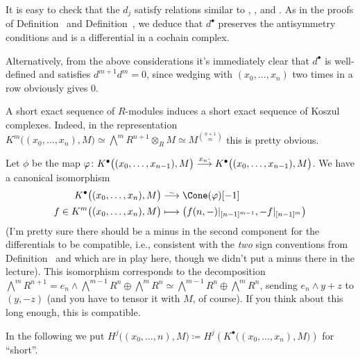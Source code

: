 \documentclass[a4paper,parskip=half,numbers=enddot, DIV=12]{scrreprt}
\begin{document}
\begin{rem}
	\begin{alphanumerate}
		\item {}It is easy to check that the $d_j$ satisfy relations similar to , , and . As in the proofs of Definition~ and Definition~, we deduce that $d^\bullet$ preserves the antisymmetry conditions and is a differential in a cochain complex. 
		
		Alternatively, from the above considerations it's immediately clear that $d^\bullet$ is well-defined and satisfies $d^{m+1}d^m=0$, since wedging with $(x_0,\ldots,x_n)$ two times in a row obviously gives $0$.
		\item A short exact sequence of $R$-modules induces a short exact sequence of Koszul complexes. Indeed, in the representation $K^m\big((x_0,\ldots,x_n),M\big)\simeq \bigwedge^mR^{n+1}\otimes_RM\simeq M^{\binom{n+1}{m}}$ this is pretty obvious.
		\item Let $\phi$ be the map $\phi\colon K^\bullet\big((x_0,\ldots,x_{n-1}),M\big)\morphism[x_n\cdot]K^\bullet\big((x_0,\ldots,x_{n-1}),M\big)$. We have a canonical isomorphism
		\begin{align}\lbl{eq:KoszulCone}
			\begin{split}
				K^\bullet\big((x_0,\ldots,x_n),M\big)&\isomorphism\Cone(\phi)[-1]\\
				f\in K^m\big((x_0,\ldots,x_n),M\big)&\longmapsto \left(f(n,-)|_{[n-1]^{m-1}}, -f|_{[n-1]^{m}}\right)
			\end{split}			
		\end{align}
		(I'm pretty sure there should be a minus in the second component for the differentials to be compatible, i.e., consistent with the \emph{two} sign conventions from Definition~ and  which are in play here, though we didn't put a minus there in the lecture). This isomorphism corresponds to the decomposition $\bigwedge^mR^{n+1}=e_n\wedge \bigwedge^{m-1}R^n\oplus \bigwedge^mR^n\simeq \bigwedge^{m-1}R^n\oplus \bigwedge^mR^n$, sending $e_n\wedge y+z$ to $(y,-z)$ (and you have to tensor it with $M$, of course). If you think about this long enough, this is compatible.
	\end{alphanumerate}
\end{rem}
In the following we put $H^j\big((x_0,\ldots,n),M\big)\coloneqq H^j\left(K^\bullet\big((x_0,\ldots,x_n),M\big)\right)$ for ``short''.
\end{document}
